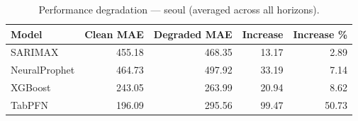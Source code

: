 \begin{table}[h]
\centering
\caption{Performance degradation — seoul (averaged across all horizons).}
\label{tab:degradation_summary_seoul}
\begin{tabular}{lrrrr}
\toprule
Model & Clean MAE & Degraded MAE & Increase & Increase \% \\
\midrule
SARIMAX & 455.18 & 468.35 & 13.17 & 2.89 \\
NeuralProphet & 464.73 & 497.92 & 33.19 & 7.14 \\
XGBoost & 243.05 & 263.99 & 20.94 & 8.62 \\
TabPFN & 196.09 & 295.56 & 99.47 & 50.73 \\
\bottomrule
\end{tabular}
\end{table}
